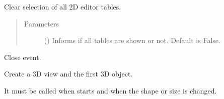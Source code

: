 \documentclass[a4paper,10pt,english]{sphinxmanual}
\begin{document}
\begin{fulllineitems}
\begin{fulllineitems}
\begin{quote}
\begin{description}
\end{description}\end{quote}

\end{fulllineitems}


\begin{fulllineitems}
\label{\detokenize{autodoc/mrsprint/mrsprint:mrsprint.mainwindow.MainWindow.clearSelection2DEditor}}
Clear selection of all 2D editor tables.
\begin{quote}\begin{description}
\item[{Parameters}] \leavevmode
{} () \textendash{} Informs if all tables are shown or not. Default is False.

\end{description}\end{quote}

\end{fulllineitems}


\begin{fulllineitems}
\label{\detokenize{autodoc/mrsprint/mrsprint:mrsprint.mainwindow.MainWindow.closeEvent}}
Close event.

\end{fulllineitems}


\begin{fulllineitems}
\label{\detokenize{autodoc/mrsprint/mrsprint:mrsprint.mainwindow.MainWindow.create3DView}}
Create a 3D view and the first 3D object.

It must be called when starts and when the shape or size is changed.

\end{fulllineitems}



\end{fulllineitems}
\end{document}
